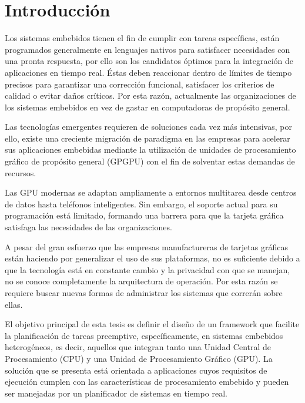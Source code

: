 

\chapter{Introducción}
\label{cha:Introducción}

\graphicspath{{figures/}}

Los sistemas embebidos tienen el fin de cumplir con tareas específicas, están programados generalmente en lenguajes nativos para satisfacer necesidades con una pronta respuesta, por ello son los candidatos óptimos para la integración de aplicaciones en tiempo real. Éstas deben reaccionar dentro de límites de tiempo precisos para garantizar una corrección funcional, satisfacer los criterios de calidad o evitar daños críticos. Por esta razón, actualmente las organizaciones de los sistemas embebidos en vez de gastar en computadoras de propósito general.
\newline

Las tecnologías emergentes requieren de soluciones cada vez más intensivas, por ello, existe una creciente migración de paradigma en las empresas para acelerar sus aplicaciones embebidas mediante la utilización de unidades de procesamiento gráfico de propósito general (GPGPU) con el fin de solventar estas demandas de recursos.
\newline

Las GPU modernas se adaptan ampliamente a entornos multitarea desde centros de datos hasta teléfonos inteligentes. Sin embargo, el soporte actual para su programación está limitado, formando una barrera para que la tarjeta gráfica satisfaga las necesidades de las organizaciones.
\newline

A pesar del gran esfuerzo que las empresas manufactureras de tarjetas gráficas están haciendo por generalizar el uso de sus plataformas, no es suficiente debido a que la tecnología está en constante cambio y la privacidad con que se manejan, no se conoce completamente la arquitectura de operación. Por esta razón se requiere buscar nuevas formas de administrar los sistemas que correrán sobre ellas.
\newline

El objetivo principal de esta tesis es definir el diseño de un framework que facilite la planificación de tareas preemptive, específicamente, en sistemas embebidos heterogéneos, es decir, aquellos que integran tanto una Unidad Central de Procesamiento (CPU) y una Unidad de Procesamiento Gráfico (GPU). La solución que se presenta está orientada a aplicaciones cuyos requisitos de ejecución cumplen con las características de procesamiento embebido y pueden ser manejadas por un planificador de sistemas en tiempo real.
\newline

